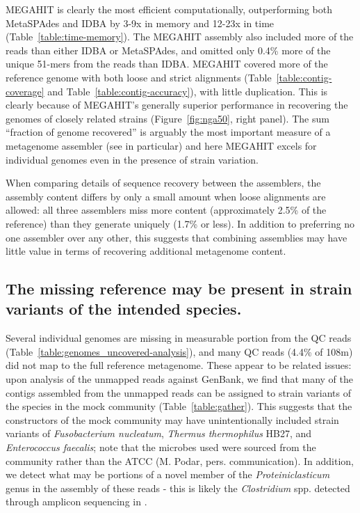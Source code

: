\documentclass[11pt]{article}
\begin{document}
MEGAHIT is clearly the most efficient computationally, outperforming
both MetaSPAdes and IDBA by 3-9x in memory and 12-23x in time
(Table~\ref{table:time-memory}).  The MEGAHIT assembly also included
more of the reads than either IDBA or MetaSPAdes, and omitted only 0.4\%
more of the unique 51-mers from the reads than IDBA.  MEGAHIT covered
more of the reference genome with both loose and strict alignments
(Table~\ref{table:contig-coverage} and
Table~\ref{table:contig-accuracy}), with little duplication.  This is
clearly because of MEGAHIT's generally superior performance in recovering the
genomes of closely related strains (Figure~\ref{fig:nga50}, right
panel).  The sum ``fraction of genome recovered'' is arguably the most
important measure of a metagenome assembler (see \cite{Vollmers2017}
in particular) and here MEGAHIT excels for individual genomes even in
the presence of strain variation.



When comparing details of sequence recovery between the assemblers,
the assembly content differs by only a small amount when loose
alignments are allowed: all three assemblers miss more content
(approximately 2.5\% of the reference) than they generate uniquely
(1.7\% or less).  In addition to preferring no one assembler over any
other, this suggests that combining assemblies may have little value
in terms of recovering additional metagenome content.

\subsection*{The missing reference may be present in strain variants of the intended species.}

Several individual genomes are missing in measurable portion from the
QC reads (Table~\ref{table:genomes_uncovered-analysis}), and many QC
reads (4.4\% of 108m) did not map to the full reference metagenome.
These appear to be related issues: upon analysis of the unmapped reads
against GenBank, we find that many of the contigs assembled from the
unmapped reads can be assigned to strain variants of the species in
the mock community (Table~\ref{table:gather}).  This suggests that the
constructors of the mock community may have unintentionally included
strain variants of {\em Fusobacterium nucleatum}, {\em Thermus
  thermophilus} HB27, and {\em Enterococcus faecalis}; note that the
microbes used were sourced from the community rather than the ATCC
(M. Podar, pers.  communication).  In addition, we detect what may be
portions of a novel member of the {\em Proteiniclasticum} genus in the
assembly of these reads - this is likely the {\em Clostridium} spp. detected
through amplicon sequencing in \cite{podar}.
\end{document}
